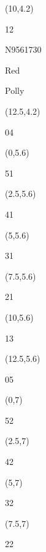 \documentclass[a4paper]{article}
\newcommand{\myseat}[4]{%
\vspace{-0.1cm}
\parbox[t][2.2cm][t]{3.5cm}{
\small #1 %
\begin{description}
\vspace{-0.1cm}
\item [ID:] #2
\vspace{-0.1cm}
\item [Team:] #3 \normalsize
\vspace{-0.1cm}
\item \normalsize #4
\vspace{-0.1cm}
\end{description}
}
}
\begin{document}
\begin{CJK}{UTF8}{cyberbit}
\begin{textblock}{2.5}(10,4.2)
	\myseat{12}{N9561730}{Red}{Polly}
\end{textblock}

\begin{textblock}{2.5}(12.5,4.2)
\textblockcolor{}
	\myseat{04}{}{}{}
\end{textblock}

\begin{textblock}{2.5}(0,5.6)
\textblockcolor{}
\myseat{51}{}{}{}
\end{textblock}

\begin{textblock}{2.5}(2.5,5.6)
\textblockcolor{}
\myseat{41}{}{}{}
\end{textblock}

\begin{textblock}{2.5}(5,5.6)
\textblockcolor{}
\myseat{31}{}{}{}
\end{textblock}

\begin{textblock}{2.5}(7.5,5.6)
\textblockcolor{}
\myseat{21}{}{}{}
\end{textblock}

\begin{textblock}{2.5}(10,5.6)
\textblockcolor{}
\myseat{13}{}{}{}
\end{textblock}

\begin{textblock}{2.5}(12.5,5.6)
\textblockcolor{}
\myseat{05}{}{}{}
\end{textblock}

\begin{textblock}{2.5}(0,7)
\textblockcolor{}
\myseat{52}{}{}{}
\end{textblock}

\begin{textblock}{2.5}(2.5,7)
\textblockcolor{}
\myseat{42}{}{}{}
\end{textblock}

\begin{textblock}{2.5}(5,7)
\textblockcolor{}
\myseat{32}{}{}{}
\end{textblock}

\begin{textblock}{2.5}(7.5,7)
\textblockcolor{}
\myseat{22}{}{}{}
\end{textblock}


\end{CJK}
\end{document}
